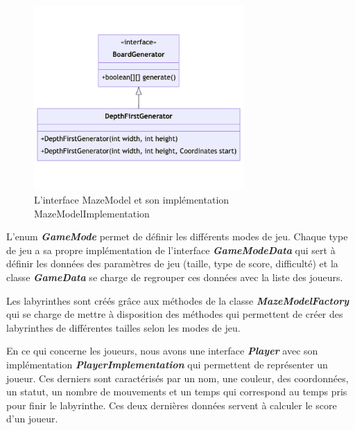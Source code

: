 \begin{figure}[htb]
    \centering
    \includegraphics[width=8cm]{ressources/Implementation/Labyrinthe/Modele/DepthFirstGenerator.png}
    \caption{L'interface MazeModel et son implémentation MazeModelImplementation}
    \label{fig:MazeModelAndImplementation}
\end{figure}

L'enum \textbf{\textit{GameMode}} permet de définir les différents modes de
jeu. Chaque type de jeu a sa propre implémentation de l'interface
\textbf{\textit{GameModeData}} qui sert à définir les données des paramètres de
jeu (taille, type de score, difficulté) et la classe \textbf{\textit{GameData}}
se charge de regrouper ces données avec la liste des joueurs.

Les labyrinthes sont créés grâce aux méthodes de la classe
\textbf{\textit{MazeModelFactory}} qui se charge de mettre à disposition des
méthodes qui permettent de créer des labyrinthes de différentes tailles selon
les modes de jeu.

En ce qui concerne les joueurs, nous avons une interface
\textbf{\textit{Player}} avec son implémentation
\textbf{\textit{PlayerImplementation}} qui permettent de représenter un joueur.
Ces derniers sont caractérisés par un nom, une couleur, des coordonnées, un
statut, un nombre de mouvements et un temps qui correspond au temps pris pour
finir le labyrinthe. Ces deux dernières données servent à calculer le score
d'un joueur.

